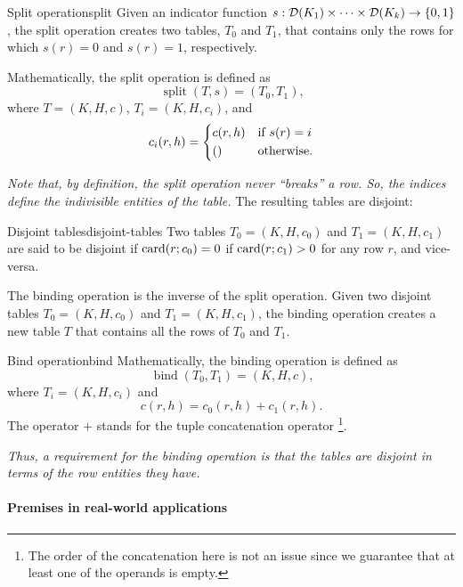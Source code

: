 \begin{defbox}{Split operation}{split}
Given an indicator function $s : \domainof{K_1} \times \dots \times \domainof{K_k} \to
\left\{0, 1\right\}$, the split operation creates two tables, $T_0$ and $T_1$, that
contains only the rows for which
$s(r) = 0$ and $s(r) = 1$, respectively.

Mathematically, the split operation is defined as \[
  \operatorname{split}(T, s) = \left(T_0, T_1\right)\text{,}
\] where $T = (K, H, c)$, $T_i = (K, H, c_i)$, and \[
  c_i(r, h) = \begin{dcases}
    c(r, h) & \text{if } s(r) = i \\
    () & \text{otherwise.}
  \end{dcases}
\]
\end{defbox}

\emph{Note that, by definition, the split operation never ``breaks'' a row.  So, the
indices define the indivisible entities of the table.}  The resulting tables are
disjoint:

\begin{defbox}{Disjoint tables}{disjoint-tables}
  Two tables $T_0 = (K, H, c_0)$ and $T_1 = (K, H, c_1)$ are said to be disjoint if
  $\rowcard[r; c_0] = 0$ if $\rowcard[r; c_1] > 0$ for any row $r$, and vice-versa.
\end{defbox}

The binding operation is the inverse of the split operation.  Given two disjoint tables
$T_0 = (K, H, c_0)$ and $T_1 = (K, H, c_1)$, the binding operation creates a new table $T$
that contains all the rows of $T_0$ and $T_1$.

\begin{defbox}{Bind operation}{bind}
  Mathematically, the binding operation is defined as \[
    \operatorname{bind}(T_0, T_1) = (K, H, c)\text{,}
  \] where $T_i = (K, H, c_i)$ and \[ c(r, h) = c_0(r, h) + c_1(r, h)\text{.} \]
  The operator $+$ stands for the tuple concatenation operator%
  \footnote{The order of the concatenation here is not an issue since we guarantee
  that at least one of the operands is empty.}.
\end{defbox}

\emph{Thus, a requirement for the binding operation is that the tables are disjoint in
terms of the row entities they have.}

\paragraph{Premises in real-world applications}

